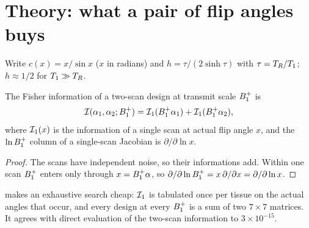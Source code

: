 \section{Theory: what a pair of flip angles buys}\label{sec:theory}

Write $c(x)=x/\sin x$ ($x$ in radians) and $h=\tau/(2\sinh\tau)$ with $\tau=T_R/T_1$; $h\approx1/2$ for
$T_1\gg T_R$.

\begin{proposition}[Decomposition]\label{prop:decomp}
The Fisher information of a two-scan design at transmit scale $B_1^{+}$ is
\begin{equation}
  \mathcal{I}(\alpha_1,\alpha_2;B_1^{+})=\mathcal{I}_1(B_1^{+}\alpha_1)+\mathcal{I}_1(B_1^{+}\alpha_2),
  \label{eq:decomp}
\end{equation}
where $\mathcal{I}_1(x)$ is the information of a single scan at actual flip angle $x$, and the $\ln B_1^{+}$
column of a single-scan Jacobian is $\partial/\partial\ln x$.
\end{proposition}
\begin{proof}
The scans have independent noise, so their informations add. Within one scan $B_1^{+}$ enters only
through $x=B_1^{+}\alpha$, so $\partial/\partial\ln B_1^{+}=x\,\partial/\partial x=\partial/\partial\ln x$.
\end{proof}

 makes an exhaustive search cheap: $\mathcal{I}_1$ is tabulated once per tissue on the
actual angles that occur, and every design at every $B_1^{+}$ is a sum of two $7\times7$ matrices. It
agrees with direct evaluation of the two-scan information to $3\times10^{-15}$.

